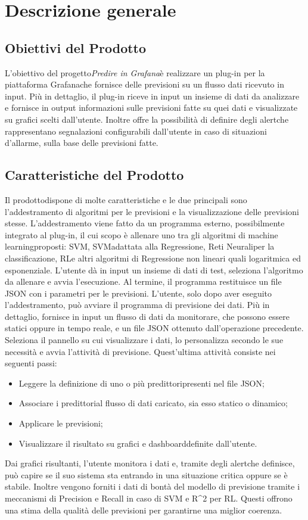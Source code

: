 \section{Descrizione generale}
	\subsection{Obiettivi del Prodotto}
	L'obiettivo del progetto\glosp \textit{Predire in Grafana}\glosp è realizzare un plug-in per la piattaforma Grafana\glosp che fornisce delle previsioni su un flusso dati ricevuto in input.
	Più in dettaglio, il plug-in riceve in input un insieme di dati da analizzare e fornisce in output informazioni sulle previsioni fatte su quei dati e visualizzate su grafici scelti dall'utente. Inoltre offre la possibilità di definire degli alert\glosp che rappresentano segnalazioni configurabili dall'utente in caso di situazioni d'allarme, sulla base delle previsioni fatte. 
	\subsection{Caratteristiche del Prodotto}
	Il prodotto\glosp dispone di molte caratteristiche e le due principali sono l'addestramento di algoritmi per le previsioni e la visualizzazione delle previsioni stesse.
	L'addestramento viene fatto da un programma esterno, possibilmente integrato al plug-in, il cui scopo è allenare uno tra gli algoritmi di machine learning\glosp proposti: SVM\glo, SVM\glosp adattata alla Regressione, Reti Neurali\glosp per la classificazione, RL\glosp e altri algoritmi di Regressione non lineari quali logaritmica ed esponenziale. L'utente dà in input un insieme di dati di test, seleziona l'algoritmo da allenare e avvia l'esecuzione. Al termine, il programma restituisce un file JSON con i parametri per le previsioni.
	L'utente, solo dopo aver eseguito l'addestramento, può avviare il programma di previsione dei dati. Più in dettaglio, fornisce in input un flusso di dati da monitorare, che possono essere statici oppure in tempo reale, e un file JSON ottenuto dall'operazione precedente. Seleziona il pannello su cui visualizzare i dati, lo personalizza secondo le sue necessità e avvia l'attività di previsione. Quest'ultima attività consiste nei seguenti passi:
	\begin{itemize}
		\item Leggere la definizione di uno o più predittori\glosp presenti nel file JSON;
		\item Associare i predittori\glosp al flusso di dati caricato, sia esso statico o dinamico;
		\item Applicare le previsioni;
		\item Visualizzare il risultato su grafici e dashboard\glosp definite dall'utente.
	\end{itemize}
	Dai grafici risultanti, l'utente monitora i dati e, tramite degli alert\glosp che definisce, può capire se il suo sistema sta entrando in una situazione critica oppure se è stabile.
	Inoltre vengono forniti i dati di bontà del modello di previsione tramite i meccanismi di Precision e Recall in caso di SVM e R\^{}2 per RL\glo. Questi offrono una stima della qualità delle previsioni per garantirne una miglior coerenza.
